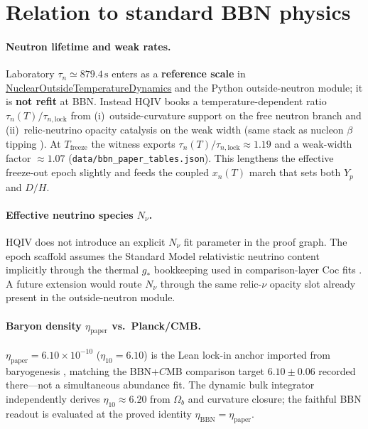\documentclass[11pt]{amsart}
\newcommand{\etap}{\ensuremath{\eta_{\mathrm{paper}}}}
\newcommand{\etaBBN}{\ensuremath{\eta_{\mathrm{BBN}}}}
\begin{document}
\section{Relation to standard BBN physics}
\label{sec:standard-bbn}

\paragraph{Neutron lifetime and weak rates.}
Laboratory $\tau_n\simeq 879.4\,\mathrm{s}$ enters as a \textbf{reference
scale} in \hyperref[lean:bbn-outside-neutron]{NuclearOutsideTemperatureDynamics}
and the Python outside-neutron module; it is \textbf{not refit} at BBN.
Instead HQIV books a temperature-dependent ratio
$\tau_n(T)/\tau_{n,\mathrm{lock}}$ from (i)~outside-curvature support on the
free neutron branch and (ii)~relic-neutrino opacity catalysis on the weak width
(same stack as nucleon $\beta$ tipping \cite{hqiv-nucleon-binding-paper}).
At $T_{\mathrm{freeze}}$ the witness exports
$\tau_n(T)/\tau_{n,\mathrm{lock}}\approx 1.19$ and a weak-width factor
$\approx 1.07$ (\texttt{data/bbn\_paper\_tables.json}).  This lengthens the
effective freeze-out epoch slightly and feeds the coupled $x_n(T)$ march that
sets both $Y_p$ and $D/H$.

\paragraph{Effective neutrino species $N_\nu$.}
HQIV does not introduce an explicit $N_\nu$ fit parameter in the proof graph.
The epoch scaffold assumes the Standard Model relativistic neutrino content
implicitly through the thermal $g_\ast$ bookkeeping used in comparison-layer
Coc fits \cite{coc2015}.  A future extension would route $N_\nu$ through the
same relic-$\nu$ opacity slot already present in the outside-neutron module.

\paragraph{Baryon density \etap{} vs.\ Planck/CMB.}
$\etap=6.10\times10^{-10}$ ($\eta_{10}=6.10$) is the Lean lock-in anchor
imported from baryogenesis \cite{hqiv-baryogenesis-paper}, matching the
BBN+$C$MB comparison target $6.10\pm0.06$ recorded there---not a simultaneous
abundance fit.  The dynamic bulk integrator independently derives
$\eta_{10}\approx 6.20$ from $\Omega_b$ and curvature closure; the faithful
BBN readout is evaluated at the proved identity $\etaBBN=\etap$.
\end{document}
